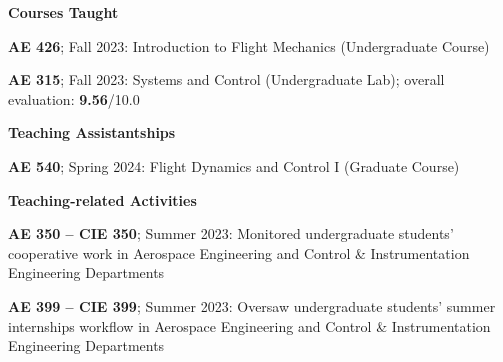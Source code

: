 \textbf{Courses Taught}
\begin{enumerate}[label={[\arabic*]}]
    \item \textbf{AE 426}; Fall 2023: Introduction to Flight Mechanics (Undergraduate Course)

    \item \textbf{AE 315}; Fall 2023: Systems and Control (Undergraduate Lab); {overall evaluation}: \textbf{9.56}/10.0
\end{enumerate}

\textbf{Teaching Assistantships}
\begin{enumerate}[label={[\arabic*]}, resume]
        \item \textbf{AE 540}; Spring 2024: Flight Dynamics and Control I (Graduate Course)
\end{enumerate}

\textbf{Teaching-related Activities}
\begin{enumerate}[label={[\arabic*]}, resume]
    \item \textbf{AE 350 – CIE 350};  Summer 2023: Monitored undergraduate students' cooperative work in Aerospace Engineering and Control \& Instrumentation Engineering Departments
    \item \textbf{AE 399 – CIE 399}; Summer 2023: Oversaw undergraduate students' summer internships workflow in Aerospace Engineering and Control \& Instrumentation Engineering Departments
\end{enumerate}

\vspace{-0.1cm}